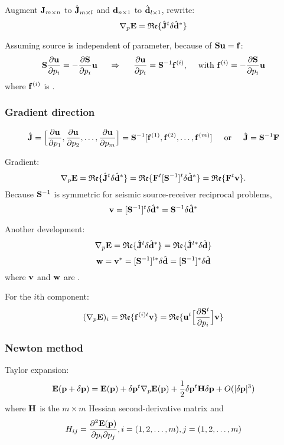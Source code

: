 Augment $\mathbf{J}_{m\times n}$ to $\hat{\mathbf{J}}_{m\times l}$
and $\mathbf{d}_{n\times 1}$ to $\hat{\mathbf{d}}_{l\times 1}$,
rewrite:
\[ \nabla_p\mathbf{E}=\mathfrak{Re}\{\hat{\mathbf{J}}^t\delta\hat{\mathbf{d}}^* \} \]

Assuming source is independent of parameter, because of $\mathbf{S}\mathbf{u}=\mathbf{f}$:
\[ \mathbf{S}\frac{\partial\mathbf{u}}{\partial p_i}=-\frac{\partial\mathbf{S}}{\partial p_i}\mathbf{u} \hspace{5mm}\Rightarrow\hspace{5mm} \frac{\partial\mathbf{u}}{\partial p_i}=\mathbf{S}^{-1}\mathbf{f}^{(i)} \text{,\hspace{5mm}with~} \mathbf{f}^{(i)}=-\frac{\partial\mathbf{S}}{\partial p_i}\mathbf{u}\]
where $\mathbf{f}^{(i)}$ is .

\subsubsection{Gradient direction}
\[ \hat{\mathbf{J}}=\Big[\frac{\partial\mathbf{u}}{\partial p_1},\frac{\partial\mathbf{u}}{\partial p_2},\ldots,\frac{\partial\mathbf{u}}{\partial p_m}\Big]=\mathbf{S}^{-1}[\mathbf{f}^{(1)},\mathbf{f}^{(2)},\ldots,\mathbf{f}^{(m)}] \text{\hspace{5mm}or\hspace{5mm}} \hat{\mathbf{J}}=\mathbf{S}^{-1}\mathbf{F} \]

Gradient:
\[ \nabla_p\mathbf{E}=\mathfrak{Re}\{\hat{\mathbf{J}}^t\delta\hat{\mathbf{d}}^*\}=\mathfrak{Re}\{\mathbf{F}^t[\mathbf{S}^{-1}]^t\delta\hat{\mathbf{d}}^*\}=\mathfrak{Re}\{\mathbf{F}^t\mathbf{v}\}. \]
Because $\mathbf{S}^{-1}$ is symmetric for seismic source-receiver reciprocal problems,
\[ \mathbf{v}=[\mathbf{S}^{-1}]^t\delta\hat{\mathbf{d}}^*=\mathbf{S}^{-1}\delta\hat{\mathbf{d}}^* \]

Another development:
\[ \nabla_p\mathbf{E}=\mathfrak{Re}\{\hat{\mathbf{J}}^t\delta\hat{\mathbf{d}}^*\}=\mathfrak{Re}\{\hat{\mathbf{J}}^{t*}\delta\hat{\mathbf{d}}\} \]
\[ \mathbf{w}=\mathbf{v}^*=[\mathbf{S}^{-1}]^{t*}\delta\hat{\mathbf{d}}=[\mathbf{S}^{-1}]^*\delta\hat{\mathbf{d}} \]
where $\mathbf{v}$ and $\mathbf{w}$ are .

For the $i$th component:
\[ (\nabla_p\mathbf{E})_i=\mathfrak{Re}\{\mathbf{f}^{(i)t}\mathbf{v}\}=\mathfrak{Re}\{\mathbf{u}^t\Big[\frac{\partial\mathbf{S}^t}{\partial p_i}\Big]\mathbf{v}\} \]

\subsubsection{Newton method}
Taylor expansion:
\[ \mathbf{E}(\mathbf{p}+\delta\mathbf{p})=\mathbf{E}(\mathbf{p})+\delta\mathbf{p}^t\nabla_p\mathbf{E}(\mathbf{p})+\frac{1}{2}\delta\mathbf{p}^t\mathbf{H}\delta\mathbf{p}+O(|\delta\mathbf{p}|^3)  \]
where $\mathbf{H}$ is the $m\times m$ Hessian second-derivative matrix and
\[ H_{ij}=\frac{\partial^2\mathbf{E}(\mathbf{p})}{\partial p_i\partial p_j},i=(1,2,\ldots,m),j=(1,2,\ldots,m) \]

